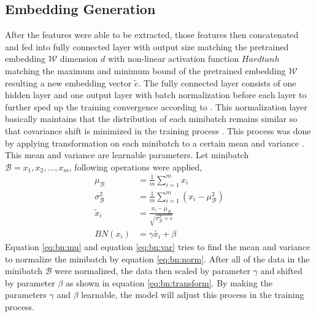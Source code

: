     \subsection{Embedding Generation}
        After the features were able to be extracted, those features
        then concatenated and fed into fully connected layer with
        output size matching the pretrained embedding $\mathcal{W}$
        dimension $d$ with non-linear activation function $Hardtanh$
        matching the maximum and minimum bound of the pretrained
        embedding $\mathcal{W}$ resulting a new embedding vector
        $\tilde{e}$. The fully connected layer consists of one hidden
        layer and one output layer with batch normalization before
        each layer to further sped up the training convergence
        according to \cite{batchnorm:DBLP:journals/corr/IoffeS15}.
        This normalization layer basically maintains that the
        distribution of each minibatch remains similar so that
        covariance shift is minimized in the training process
        \citep{batchnorm:DBLP:journals/corr/IoffeS15}. This process
        was done by applying transformation on each minibatch to a
        certain mean and variance
        \citep{batchnorm:DBLP:journals/corr/IoffeS15}. This mean and
        variance are learnable parameters. Let minibatch $\mathcal{B}
        = {x_1, x_2, \dots, x_m}$, following operations were applied,
        \begin{align}
            \label{eq:bn:mu}
            \mu_{\mathcal{B}} &= \frac{1}{m} \sum_{i=1}^m x_i\\
            \label{eq:bn:var}
            \sigma^2_{\mathcal{B}} &= \frac{1}{m} \sum_{i=1}^m \left(x_i - \mu_{\mathcal{B}}^2\right)\\
            \label{eq:bn:norm}            
            \tilde{x}_i &= \frac{x_i - \mu_{\mathcal{B}}}{\sqrt{\sigma^2_{\mathcal{B}} + \epsilon}}\\
            \label{eq:bn:transform}            
            BN(x_i) &= \gamma\tilde{x_i} + \beta
        \end{align}
        Equation \ref{eq:bn:mu} and equation \ref{eq:bn:var} tries to
        find the mean and variance to normalize the minibatch by
        equation \ref{eq:bn:norm}. After all of the data in the
        minibatch $\mathcal{B}$ were normalized, the data then scaled
        by parameter $\gamma$ and shifted by parameter $\beta$ as
        shown in equation \ref{eq:bn:transform}. By making the
        parameters $\gamma$ and $\beta$ learnable, the model will
        adjust this process in the training process.

